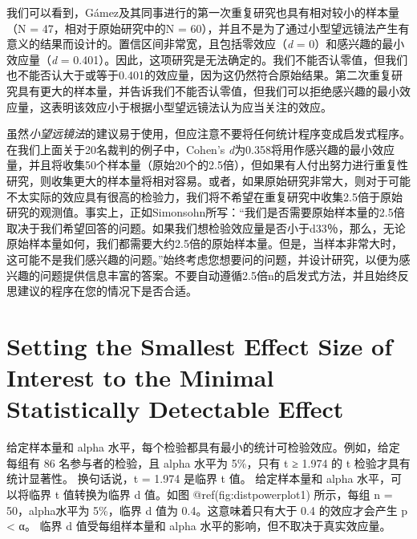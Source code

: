 \documentclass[
  letterpaper,
  DIV=11,
  numbers=noendperiod]{scrreprt}
\begin{document}
我们可以看到，Gámez及其同事进行的第一次重复研究也具有相对较小的样本量（N
= 47，相对于原始研究中的N =
60），并且不是为了通过小型望远镜法产生有意义的结果而设计的。置信区间非常宽，且包括零效应（\emph{d}
= 0）和感兴趣的最小效应量（\emph{d} =
0.401）。因此，这项研究是无法确定的。我们不能否认零值，但我们也不能否认大于或等于0.401的效应量，因为这仍然符合原始结果。第二次重复研究具有更大的样本量，并告诉我们不能否认零值，但我们可以拒绝感兴趣的最小效应量，这表明该效应小于根据小型望远镜法认为应当关注的效应。

虽然\emph{小望远镜法}的建议易于使用，但应注意不要将任何统计程序变成启发式程序。
在我们上面关于20名裁判的例子中，Cohen's
\emph{d}为0.358将用作感兴趣的最小效应量，并且将收集50个样本量（原始20个的2.5倍），但如果有人付出努力进行重复性研究，则收集更大的样本量将相对容易。或者，如果原始研究非常大，则对于可能不太实际的效应具有很高的检验力，我们将不希望在重复研究中收集2.5倍于原始研究的观测值。事实上，正如Simonsohn所写：``我们是否需要原始样本量的2.5倍取决于我们希望回答的问题。如果我们想检验效应量是否小于d33％，那么，无论原始样本量如何，我们都需要大约2.5倍的原始样本量。但是，当样本非常大时，这可能不是我们感兴趣的问题。''始终考虑您想要问的问题，并设计研究，以便为感兴趣的问题提供信息丰富的答案。不要自动遵循2.5倍n的启发式方法，并且始终反思建议的程序在您的情况下是否合适。

\hypertarget{setting-the-smallest-effect-size-of-interest-to-the-minimal-statistically-detectable-effect}{%
\section{Setting the Smallest Effect Size of Interest to the Minimal
Statistically Detectable
Effect}\label{setting-the-smallest-effect-size-of-interest-to-the-minimal-statistically-detectable-effect}}

给定样本量和 alpha
水平，每个检验都具有最小的统计可检验效应。例如，给定每组有 86
名参与者的检验，且 alpha 水平为 5\%，只有 t ≥ 1.974 的 t
检验才具有统计显著性。 换句话说，t = 1.974 是临界 t 值。 给定样本量和
alpha 水平，可以将临界 t 值转换为临界 d 值。如图
@ref(fig:distpowerplot1) 所示，每组 n = 50，alpha水平为 5\%，临界 d 值为
0.4。这意味着只有大于 0.4 的效应才会产生 p \textless{} α。 临界 d
值受每组样本量和 alpha 水平的影响，但不取决于真实效应量。
\end{document}
